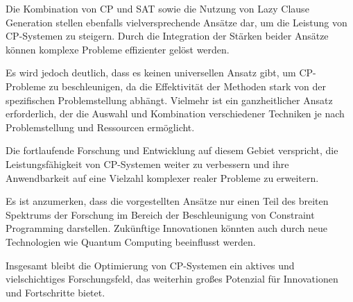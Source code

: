 Die Kombination von CP und SAT sowie die Nutzung von Lazy Clause Generation
stellen ebenfalls vielversprechende Ansätze dar, um die Leistung von CP-Systemen
zu steigern. Durch die Integration der Stärken beider Ansätze können komplexe
Probleme effizienter gelöst werden.

Es wird jedoch deutlich, dass es keinen universellen Ansatz gibt, um CP-Probleme
zu beschleunigen, da die Effektivität der Methoden stark von der spezifischen
Problemstellung abhängt. Vielmehr ist ein ganzheitlicher Ansatz erforderlich,
der die Auswahl und Kombination verschiedener Techniken je nach Problemstellung
und Ressourcen ermöglicht.

Die fortlaufende Forschung und Entwicklung auf diesem Gebiet verspricht, die
Leistungsfähigkeit von CP-Systemen weiter zu verbessern und ihre Anwendbarkeit
auf eine Vielzahl komplexer realer Probleme zu erweitern.

Es ist anzumerken, dass die vorgestellten Ansätze nur einen Teil des breiten
Spektrums der Forschung im Bereich der Beschleunigung von Constraint Programming
darstellen. Zukünftige Innovationen könnten auch durch neue Technologien wie
Quantum Computing beeinflusst werden.

Insgesamt bleibt die Optimierung von CP-Systemen ein aktives und vielschichtiges
Forschungsfeld, das weiterhin großes Potenzial für Innovationen und Fortschritte
bietet.


\printbibliography[heading=bibintoc]





